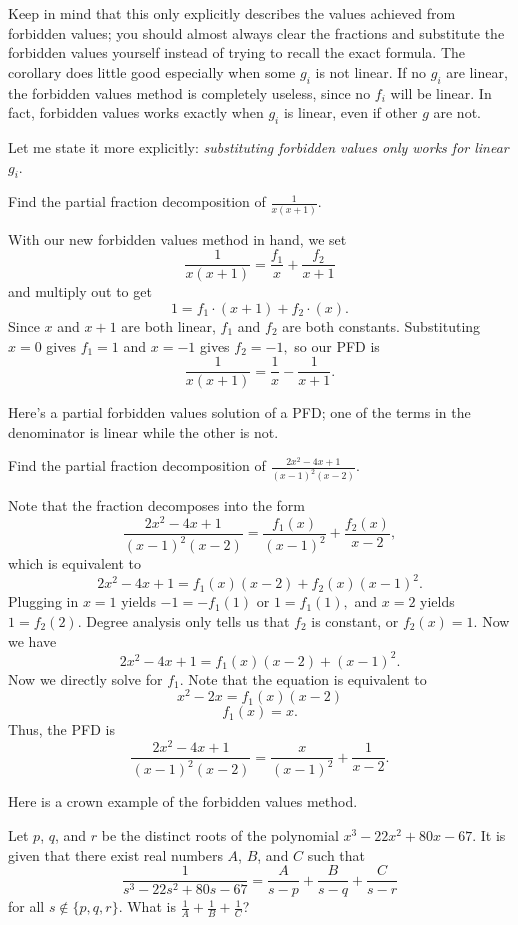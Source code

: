 \documentclass[mast]{lucky}
\begin{document}
Keep in mind that this only explicitly describes the values achieved from forbidden values; you should almost always clear the fractions and substitute the forbidden values yourself instead of trying to recall the exact formula. The corollary does little good especially when some $g_i$ is not linear. If no $g_i$ are linear, the forbidden values method is completely useless, since no $f_i$ will be linear. In fact, forbidden values works exactly when $g_i$ is linear, even if other $g$ are not.

Let me state it more explicitly: \emph{substituting forbidden values only works for linear $g_i$}.

\begin{exam}
Find the partial fraction decomposition of $\frac{1}{x(x+1)}.$
\end{exam}

\begin{sol}
With our new forbidden values method in hand, we set
\[\frac{1}{x(x+1)}=\frac{f_1}{x}+\frac{f_2}{x+1}\]
and multiply out to get
\[1=f_1\cdot (x+1)+f_2\cdot (x).\]
Since $x$ and $x+1$ are both linear, $f_1$ and $f_2$ are both constants. Substituting $x=0$ gives $f_1=1$ and $x=-1$ gives $f_2=-1,$ so our PFD is
\[\frac{1}{x(x+1)}=\frac{1}{x}-\frac{1}{x+1}.\]
\end{sol}

Here's a partial forbidden values solution of a PFD; one of the terms in the denominator is linear while the other is not.

\begin{exam}
Find the partial fraction decomposition of $\frac{2x^2-4x+1}{(x-1)^2(x-2)}.$
\end{exam}

\begin{sol}
Note that the fraction decomposes into the form
\[\frac{2x^2-4x+1}{(x-1)^2(x-2)}=\frac{f_1(x)}{(x-1)^2}+\frac{f_2(x)}{x-2},\]
which is equivalent to
\[2x^2-4x+1=f_1(x)(x-2)+f_2(x)(x-1)^2.\]
Plugging in $x=1$ yields $-1=-f_1(1)$ or $1=f_1(1),$ and $x=2$ yields $1=f_2(2).$ Degree analysis only tells us that $f_2$ is constant, or $f_2(x)=1.$ Now we have
\[2x^2-4x+1=f_1(x)(x-2)+(x-1)^2.\]
Now we directly solve for $f_1.$ Note that the equation is equivalent to
\[x^2-2x=f_1(x)(x-2)\]
\[f_1(x)=x.\]
Thus, the PFD is
\[\frac{2x^2-4x+1}{(x-1)^2(x-2)}=\frac{x}{(x-1)^2}+\frac{1}{x-2}.\]
\end{sol}

Here is a crown example of the forbidden values method.

\begin{exam}[AMC 10A 2019/24]
Let $p$, $q$, and $r$ be the distinct roots of the polynomial $x^3 - 22x^2 + 80x - 67$. It is given that there exist real numbers $A$, $B$, and $C$ such that\[\dfrac{1}{s^3 - 22s^2 + 80s - 67} = \dfrac{A}{s-p} + \dfrac{B}{s-q} + \frac{C}{s-r}\]for all $s\not\in\{p,q,r\}$. What is $\tfrac1A+\tfrac1B+\tfrac1C$?
\end{exam}
\end{document}
